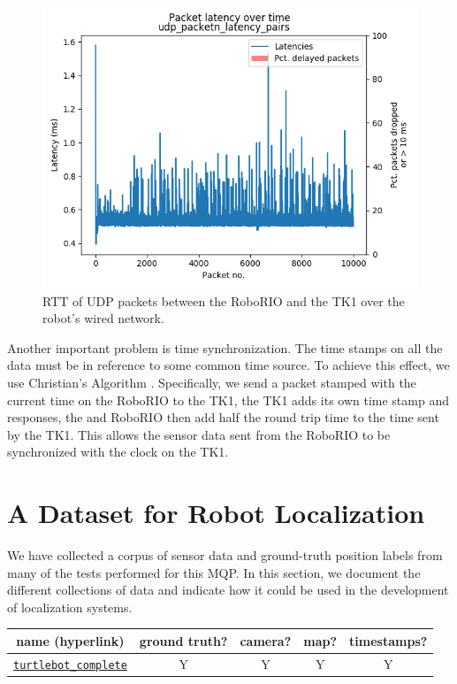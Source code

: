 \documentclass{article}
\begin{document}
		\begin{figure}[H]
			\centering
			\includegraphics[width=0.7\linewidth]{./images/rio_tk1_udp_latency_timeseries.png}
			\caption{RTT of UDP packets between the RoboRIO and the TK1 over the robot's wired network.}
			\label{fig:udp_timing}
		\end{figure}

		Another important problem is time synchronization. The time stamps on all the data must be in reference to some common time source. To achieve this effect, we use Christian's Algorithm \cite{cristian_probabilistic_1989}. Specifically, we send a packet stamped with the current time on the RoboRIO to the TK1, the TK1 adds its own time stamp and responses, the and RoboRIO then add half the round trip time to the time sent by the TK1. This allows the sensor data sent from the RoboRIO to be synchronized with the clock on the TK1.




\section{A Dataset for Robot Localization} \label{section:dataset}

  We have collected a corpus of sensor data and ground-truth position labels from many of the tests performed for this MQP. In this section, we document the different collections of data and indicate how it could be used in the development of localization systems.

  \begin{table}[H]
    \centering
    \begin{tabular}{|c|c|c|c|c|} \hline
      name (hyperlink) & ground truth? & camera? & map? & timestamps? \\ \hline
      \href{https://users.wpi.edu/~pdmitrano/phil-datasets/turtlebot_mocap_complete.tar.gz}{\texttt{turtlebot\_complete}} & Y & Y & Y & Y \\ \hline
    \end{tabular}
    \label{table:datasets}
  \end{table}
\end{document}
